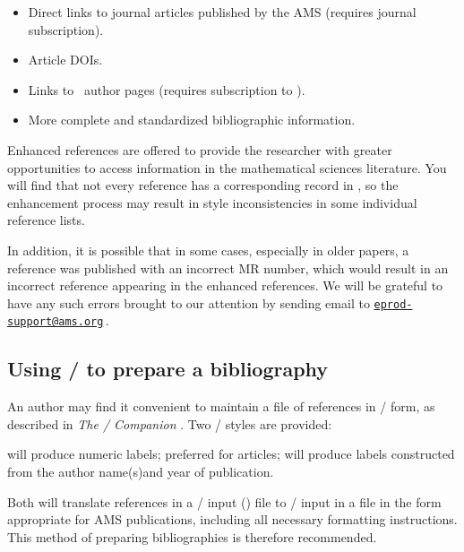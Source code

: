 \begin{itemize}
\item Direct links to journal articles published by the AMS
 (requires journal subscription).
\item Article DOIs.
\item Links to \MSN\ author pages (requires subscription to \MSN).
\item More complete and standardized bibliographic information.
\end{itemize}


Enhanced references are offered to provide the researcher with greater
opportunities to access information in the mathematical sciences
literature. You will find that not every reference has a corresponding
record in \MSN, so the enhancement process may result in style
inconsistencies in some individual reference lists.

In addition, it is possible that in some cases, especially in older
papers, a reference was published with an incorrect MR number, which
would result in an incorrect reference appearing in the enhanced
references. We will be grateful to have any such errors brought to our
attention by sending email to
\href{mailto:eprod-support@ams.org}{\texttt{eprod-support@ams.org}}\,.
\fi %

\subsection{Using \bibtex/ to prepare a bibliography}%
An author may find it convenient to maintain a file of references in
\bibtex/ form, as described in \textit{The \latex/ Companion}
\cite[Section 13.2]{MG}. Two \bibtex/ styles are provided:

\begingroup
{}\parindent
\beginexample{\exboxwidth=1.05in}
 will produce numeric labels; preferred for articles;
 will produce labels constructed from the %
  author name(s)\newline and year of publication.
\endexample
\endgroup

\noindent
Both will translate references in a \bibtex/ input ()
file to \latex/ input in a  file in the form appropriate
for AMS publications, including all necessary formatting instructions.
This method of preparing bibliographies is therefore recommended.

